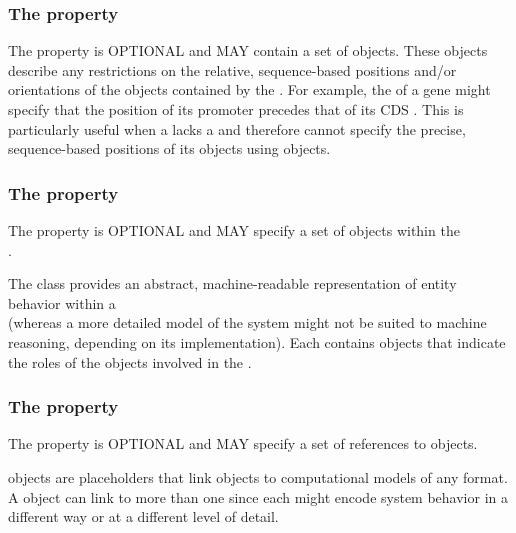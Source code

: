 \subsubsection*{The  property}
\label{sec:constraint}

The  property is OPTIONAL and MAY contain a set of  objects. 
These objects describe any restrictions on the relative, sequence-based positions and/or orientations of the  objects contained by the .
For example, the  of a gene might specify that the position of its promoter  precedes that of its CDS . This is particularly useful when a  lacks a  and therefore cannot specify the precise, sequence-based positions of its  objects using  objects.

\subsubsection*{The  property}\label{sec:interactions}

The  property is OPTIONAL and MAY specify a set of  objects within the\\
.

The  class provides an abstract, machine-readable representation of entity behavior within a\\  (whereas a more detailed model of the system might not be suited to machine reasoning, depending on its implementation).
Each  contains  objects that indicate the roles of the  objects involved in the .

\subsubsection*{The  property}\label{sec:models}
The  property is OPTIONAL and MAY specify a set of  references to  objects.

 objects are placeholders that link  objects to computational models of any format.
A  object can link to more than one  since each might encode system behavior in a different way or at a different level of detail.

